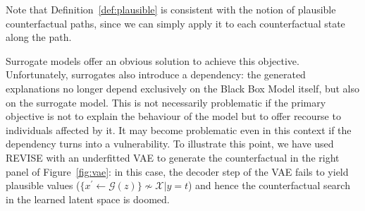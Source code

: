 \documentclass{article}
\begin{document}
Note that Definition~\ref{def:plausible} is consistent with the notion of plausible counterfactual paths, since we can simply apply it to each counterfactual state along the path.

Surrogate models offer an obvious solution to achieve this objective. Unfortunately, surrogates also introduce a dependency: the generated explanations no longer depend exclusively on the Black Box Model itself, but also on the surrogate model. This is not necessarily problematic if the primary objective is not to explain the behaviour of the model but to offer recourse to individuals affected by it. It may become problematic even in this context if the dependency turns into a vulnerability. To illustrate this point, we have used REVISE \citep{joshi2019realistic} with an underfitted VAE to generate the counterfactual in the right panel of Figure~\ref{fig:vae}: in this case, the decoder step of the VAE fails to yield plausible values ($\{x^{\prime} \leftarrow \mathcal{G}(z)\} \not\sim \mathcal{X}|y=t$) and hence the counterfactual search in the learned latent space is doomed.
\end{document}
